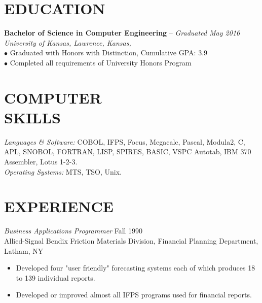 \documentclass[english,line,margin=0.2]{res}
\begin{document}
\address{\small{4628 Roberts Street, Shawnee KS 66226 $\cdot$ 913.530.0929 $\cdot$ elisemmc@gmail.com $\cdot$ http://www.github.com/elisemmc}}

\begin{resume}

\section{EDUCATION} 
	 	\textbf{Bachelor of Science in Computer Engineering} -- \textit{Graduated May 2016}\\
		\textit{University of Kansas, Lawrence, Kansas,}\\
                	$\bullet$ Graduated with Honors with Distinction, Cumulative GPA: 3.9\\
		$\bullet$ Completed all requirements of University Honors Program
 
 
\section{COMPUTER \\ SKILLS} {\sl Languages \& Software:} COBOL, IFPS, Focus, 
         Megacalc, Pascal, Modula2, C, APL, SNOBOL, 
                FORTRAN, LISP, SPIRES, BASIC, VSPC Autotab, 
                IBM 370 Assembler, Lotus 1-2-3. \\
                {\sl Operating Systems:} MTS, TSO, Unix.
 
\section{EXPERIENCE} {\sl Business Applications Programmer} \hfill Fall 1990 \\
                Allied-Signal Bendix Friction Materials Division, 
                Financial Planning Department, Latham, NY
                 \begin{itemize}  \itemsep -2pt %
                 \item Developed four "user friendly" forecasting 
                    systems each of which produces 18 to 139 
                    individual reports. 
                \item   Developed or improved almost all IFPS 
                    programs used for financial reports. 
                \end{itemize}
 

\end{resume}
\end{document}
